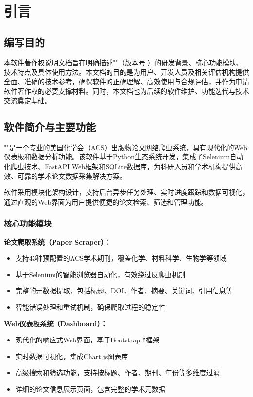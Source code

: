 
\section{引言}
\label{sec:introduction_main}

\subsection{编写目的}
\label{ssec:intro_purpose}
本软件著作权说明文档旨在明确描述"\Name"（版本号 \Version）的研发背景、核心功能模块、技术特点及具体使用方法。本文档的目的是为用户、开发人员及相关评估机构提供全面、准确的技术参考，确保软件的正确理解、高效使用与合规评估，并作为申请软件著作权的必要支撑材料。同时，本文档也为后续的软件维护、功能迭代与技术交流奠定基础。

\subsection{软件简介与主要功能}
\label{ssec:intro_summary_features}
"\Name"是一个专业的美国化学会（ACS）出版物论文网络爬虫系统，具有现代化的Web仪表板和数据分析功能。该软件基于Python生态系统开发，集成了Selenium自动化爬虫技术、FastAPI Web框架和SQLite数据库，为科研人员和学术机构提供高效、可靠的学术论文数据采集解决方案。

软件采用模块化架构设计，支持后台异步任务处理、实时进度跟踪和数据可视化，通过直观的Web界面为用户提供便捷的论文检索、筛选和管理功能。

\subsubsection{核心功能模块}
\label{sssec:core_modules}

\textbf{论文爬取系统（Paper Scraper）：}
\begin{itemize}
    \item 支持43种预配置的ACS学术期刊，覆盖化学、材料科学、生物学等领域
    \item 基于Selenium的智能浏览器自动化，有效绕过反爬虫机制
    \item 完整的元数据提取，包括标题、DOI、作者、摘要、关键词、引用信息等
    \item 智能错误处理和重试机制，确保爬取过程的稳定性
\end{itemize}

\textbf{Web仪表板系统（Dashboard）：}
\begin{itemize}
    \item 现代化的响应式Web界面，基于Bootstrap 5框架
    \item 实时数据可视化，集成Chart.js图表库
    \item 高级搜索和筛选功能，支持按标题、作者、期刊、年份等多维度过滤
    \item 详细的论文信息展示页面，包含完整的学术元数据
\end{itemize}

